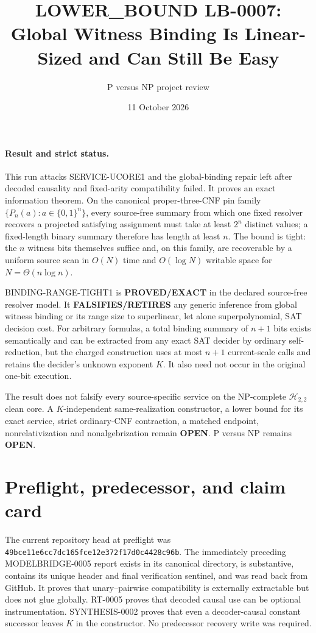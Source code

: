 \documentclass[11pt]{article}
\title{LOWER\_BOUND LB-0007:\\
Global Witness Binding Is Linear-Sized and Can Still Be Easy}
\author{P versus NP project review}
\date{11 October 2026}
\begin{document}
\maketitle

\paragraph{Result and strict status.}
This run attacks \textsf{SERVICE-UCORE1} and the global-binding repair left
after decoded causality and fixed-arity compatibility failed.  It proves an
exact information theorem.  On the canonical proper-three-CNF pin family
$\{P_n(a):a\in\{0,1\}^n\}$, every source-free summary from which one fixed
resolver recovers a projected satisfying assignment must take at least
$2^n$ distinct values; a fixed-length binary summary therefore has length at
least $n$.  The bound is tight: the $n$ witness bits themselves suffice and,
on this family, are recoverable by a uniform source scan in $O(N)$ time and
$O(\log N)$ writable space for $N=\Theta(n\log n)$.

\textsf{BINDING-RANGE-TIGHT1} is \textbf{PROVED/EXACT} in the declared
source-free resolver model.  It \textbf{FALSIFIES/RETIRES} any generic
inference from global witness binding or its range size to superlinear, let
alone superpolynomial, SAT decision cost.  For arbitrary formulas, a total
binding summary of $n+1$ bits exists semantically and can be extracted from
any exact SAT decider by ordinary self-reduction, but the charged construction
uses at most $n+1$ current-scale calls and retains the decider's unknown
exponent $K$.  It also need not occur in the original one-bit execution.

The result does not falsify every source-specific service on the NP-complete
$\mathcal H_{2,2}$ clean core.  A $K$-independent same-realization constructor,
a lower bound for its exact service, strict ordinary-CNF contraction, a
matched endpoint, nonrelativization and nonalgebrization remain
\textbf{OPEN}.  P versus NP remains \textbf{OPEN}.

\section{Preflight, predecessor, and claim card}
The current repository head at preflight was
\texttt{49bce11e6cc7dc165fce12e372f17d0c4428c96b}.  The immediately preceding
MODELBRIDGE-0005 report exists in its canonical directory, is substantive,
contains its unique header and final verification sentinel, and was read back
from GitHub.  It proves that unary--pairwise compatibility is externally
extractable but does not glue globally.  RT-0005 proves that decoded causal
use can be optional instrumentation.  SYNTHESIS-0002 proves that even a
decoder-causal constant successor leaves $K$ in the constructor.  No
predecessor recovery write was required.
\end{document}

